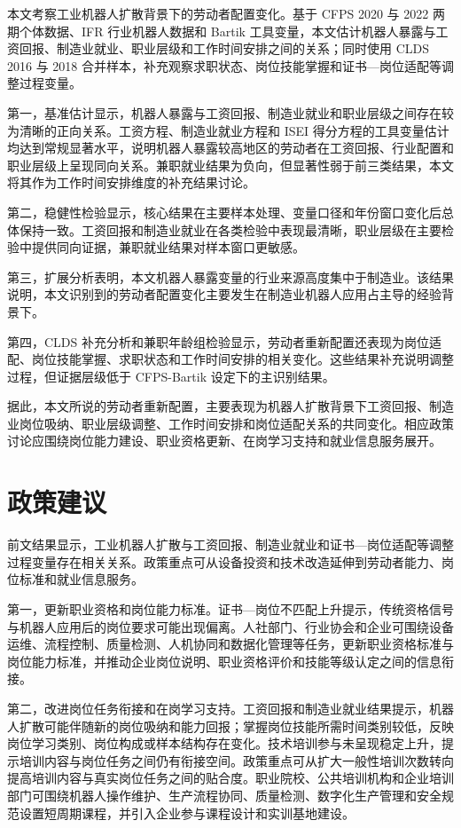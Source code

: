 \documentclass[UTF8, zihao=-4, a4paper, openany, fontset=none]{ctexrep}
\numberwithin{equation}{chapter}
\begin{document}
本文考察工业机器人扩散背景下的劳动者配置变化。基于 CFPS 2020 与 2022 两期个体数据、IFR 行业机器人数据和 Bartik 工具变量，本文估计机器人暴露与工资回报、制造业就业、职业层级和工作时间安排之间的关系；同时使用 CLDS 2016 与 2018 合并样本，补充观察求职状态、岗位技能掌握和证书---岗位适配等调整过程变量。

第一，基准估计显示，机器人暴露与工资回报、制造业就业和职业层级之间存在较为清晰的正向关系。工资方程、制造业就业方程和 ISEI 得分方程的工具变量估计均达到常规显著水平，说明机器人暴露较高地区的劳动者在工资回报、行业配置和职业层级上呈现同向关系。兼职就业结果为负向，但显著性弱于前三类结果，本文将其作为工作时间安排维度的补充结果讨论。

第二，稳健性检验显示，核心结果在主要样本处理、变量口径和年份窗口变化后总体保持一致。工资回报和制造业就业在各类检验中表现最清晰，职业层级在主要检验中提供同向证据，兼职就业结果对样本窗口更敏感。

第三，扩展分析表明，本文机器人暴露变量的行业来源高度集中于制造业。该结果说明，本文识别到的劳动者配置变化主要发生在制造业机器人应用占主导的经验背景下。

第四，CLDS 补充分析和兼职年龄组检验显示，劳动者重新配置还表现为岗位适配、岗位技能掌握、求职状态和工作时间安排的相关变化。这些结果补充说明调整过程，但证据层级低于 CFPS-Bartik 设定下的主识别结果。

据此，本文所说的劳动者重新配置，主要表现为机器人扩散背景下工资回报、制造业岗位吸纳、职业层级调整、工作时间安排和岗位适配关系的共同变化。相应政策讨论应围绕岗位能力建设、职业资格更新、在岗学习支持和就业信息服务展开。

\section{政策建议}\label{ux653fux7b56ux5efaux8bae}

前文结果显示，工业机器人扩散与工资回报、制造业就业和证书---岗位适配等调整过程变量存在相关关系。政策重点可从设备投资和技术改造延伸到劳动者能力、岗位标准和就业信息服务。

第一，更新职业资格和岗位能力标准。证书---岗位不匹配上升提示，传统资格信号与机器人应用后的岗位要求可能出现偏离。人社部门、行业协会和企业可围绕设备运维、流程控制、质量检测、人机协同和数据化管理等任务，更新职业资格标准与岗位能力标准，并推动企业岗位说明、职业资格评价和技能等级认定之间的信息衔接。

第二，改进岗位任务衔接和在岗学习支持。工资回报和制造业就业结果提示，机器人扩散可能伴随新的岗位吸纳和能力回报；掌握岗位技能所需时间类别较低，反映岗位学习类别、岗位构成或样本结构存在变化。技术培训参与未呈现稳定上升，提示培训内容与岗位任务之间仍有衔接空间。政策重点可从扩大一般性培训次数转向提高培训内容与真实岗位任务之间的贴合度。职业院校、公共培训机构和企业培训部门可围绕机器人操作维护、生产流程协同、质量检测、数字化生产管理和安全规范设置短周期课程，并引入企业参与课程设计和实训基地建设。
\end{document}
